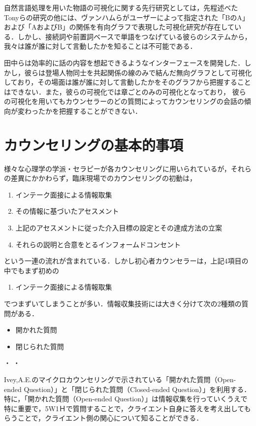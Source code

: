 \documentclass[shuuron]{kuee}
\begin{document}
自然言語処理を用いた物語の可視化に関する先行研究としては，先程述べたTonyら\cite{bergstrom2007seeing}の研究の他には、ヴァンハム\cite{van2009mapping}らがユーザーによって指定された「BのA」および「AおよびB」の関係を有向グラフで表現した可視化研究が存在している．しかし、接続詞や前置詞ベースで単語をつなげている彼らのシステムから，我々は誰が誰に対して言動したかを知ることは不可能である．

田中ら\cite{tanaka}は効率的に話の内容を想起できるようなインターフェースを開発した．しかし，彼らは登場人物同士を共起関係の線のみで結んだ無向グラフとして可視化しており，その場面は誰が誰に対して言動したかをそのグラフから把握することはできない．また，彼らの可視化では章ごとのみの可視化となっており， 彼らの可視化を用いてもカウンセラーのどの質問によってカウンセリングの会話の傾向が変わったかを把握することができない．



\chapter{カウンセリングの基本的事項}

様々な心理学の学派・セラピーが各カウンセリングに用いられているが，それらの差異にかかわらず，臨床現場でのカウンセリングの初動は，

\begin{enumerate}
 \item インテーク面接による情報取集
 \item その情報に基づいたアセスメント
 \item 上記のアセスメントに従った介入目標の設定とその達成方法の立案
 \item それらの説明と合意をとるインフォームドコンセント
\end{enumerate}
という一連の流れが含まれている．しかし初心者カウンセラーは，上記4項目の中でもまず初めの
\begin{enumerate}
 \item インテーク面接による情報取集
\end{enumerate}
でつまずいてしまうことが多い．情報収集技術には大きく分けて次の2種類の質問がある．
\begin{itemize}
\item 開かれた質問
\item 閉じられた質問
\end{itemize}
・
・


Ivey,A.E.\cite{ivey}のマイクロカウンセリングで示されている「開かれた質問（Open-ended Question）」と「閉じられた質問（Closed-ended Question）」を利用する．特に，「開かれた質問（Open-ended Question）」は情報収集を行っていくうえで特に重要で，5W1Ｈで質問することで，クライエント自身に答えを考え出してもらうことで，クライエント側の関心について知ることができる．
\end{document}
